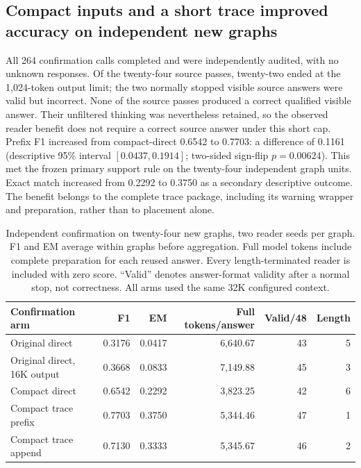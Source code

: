 \subsection{Compact inputs and a short trace improved accuracy on independent new graphs}
\label{sec:confirmed-benefit}
All 264 confirmation calls completed and were independently audited, with no unknown responses. Of the twenty-four source passes, twenty-two ended at the 1,024-token output limit; the two normally stopped visible source answers were valid but incorrect. None of the source passes produced a correct qualified visible answer. Their unfiltered thinking was nevertheless retained, so the observed reader benefit does not require a correct source answer under this short cap. Prefix F1 increased from compact-direct 0.6542 to 0.7703: a difference of 0.1161 (descriptive 95\% interval $[0.0437,0.1914]$; two-sided sign-flip $p=0.00624$). This met the frozen primary support rule on the twenty-four independent graph units. Exact match increased from 0.2292 to 0.3750 as a secondary descriptive outcome. The benefit belongs to the complete trace package, including its warning wrapper and preparation, rather than to placement alone.

\begin{table}[htbp]
\centering\small
\begin{tabular}{lrrrrr}
\toprule
Confirmation arm & F1 & EM & Full tokens/answer & Valid/48 & Length\\
\midrule
Original direct & 0.3176 & 0.0417 & 6,640.67 & 43 & 5\\
Original direct, 16K output & 0.3668 & 0.0833 & 7,149.88 & 45 & 3\\
Compact direct & 0.6542 & 0.2292 & 3,823.25 & 42 & 6\\
Compact trace prefix & 0.7703 & 0.3750 & 5,344.46 & 47 & 1\\
Compact trace append & 0.7130 & 0.3333 & 5,345.67 & 46 & 2\\
\bottomrule
\end{tabular}
\caption{Independent confirmation on twenty-four new graphs, two reader seeds per graph. F1 and EM average within graphs before aggregation. Full model tokens include complete preparation for each reused answer. Every length-terminated reader is included with zero score. ``Valid'' denotes answer-format validity after a normal stop, not correctness. All arms used the same 32K configured context.}
\label{tab:confirmation-benefit}
\end{table}

